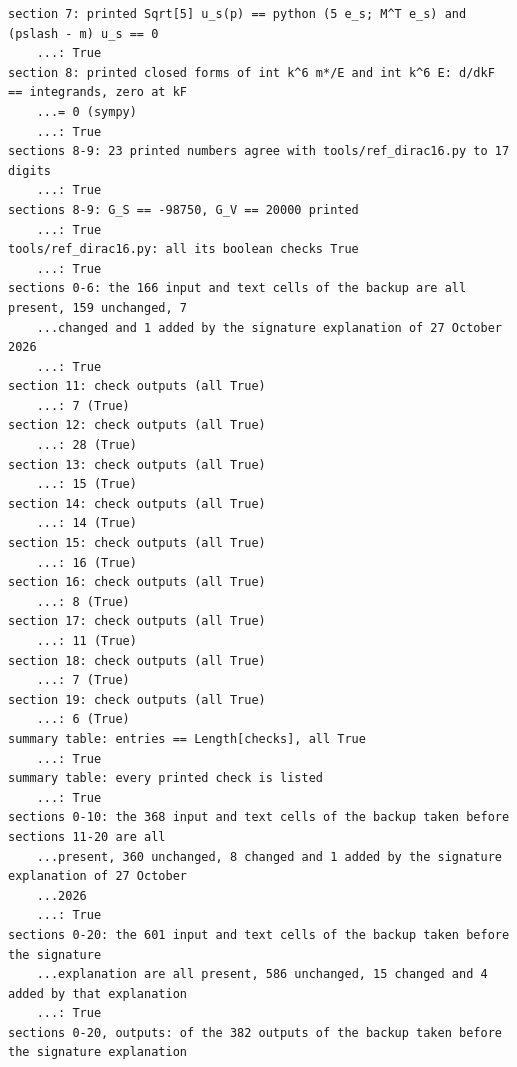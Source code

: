\documentclass[10pt,a4paper]{article}
\begin{document}
\begin{Verbatim}[fontsize=\small,frame=single,framesep=2mm]
section 7: printed Sqrt[5] u_s(p) == python (5 e_s; M^T e_s) and (pslash - m) u_s == 0         
    ...: True
section 8: printed closed forms of int k^6 m*/E and int k^6 E: d/dkF == integrands, zero at kF
    ...= 0 (sympy)                                                                             
    ...: True
sections 8-9: 23 printed numbers agree with tools/ref_dirac16.py to 17 digits                  
    ...: True
sections 8-9: G_S == -98750, G_V == 20000 printed                                              
    ...: True
tools/ref_dirac16.py: all its boolean checks True                                              
    ...: True
sections 0-6: the 166 input and text cells of the backup are all present, 159 unchanged, 7
    ...changed and 1 added by the signature explanation of 27 October 2026                     
    ...: True
section 11: check outputs (all True)                                                           
    ...: 7 (True)
section 12: check outputs (all True)                                                           
    ...: 28 (True)
section 13: check outputs (all True)                                                           
    ...: 15 (True)
section 14: check outputs (all True)                                                           
    ...: 14 (True)
section 15: check outputs (all True)                                                           
    ...: 16 (True)
section 16: check outputs (all True)                                                           
    ...: 8 (True)
section 17: check outputs (all True)                                                           
    ...: 11 (True)
section 18: check outputs (all True)                                                           
    ...: 7 (True)
section 19: check outputs (all True)                                                           
    ...: 6 (True)
summary table: entries == Length[checks], all True                                             
    ...: True
summary table: every printed check is listed                                                   
    ...: True
sections 0-10: the 368 input and text cells of the backup taken before sections 11-20 are all
    ...present, 360 unchanged, 8 changed and 1 added by the signature explanation of 27 October
    ...2026                                                                                    
    ...: True
sections 0-20: the 601 input and text cells of the backup taken before the signature
    ...explanation are all present, 586 unchanged, 15 changed and 4 added by that explanation  
    ...: True
sections 0-20, outputs: of the 382 outputs of the backup taken before the signature explanation

\end{Verbatim}
\end{document}
